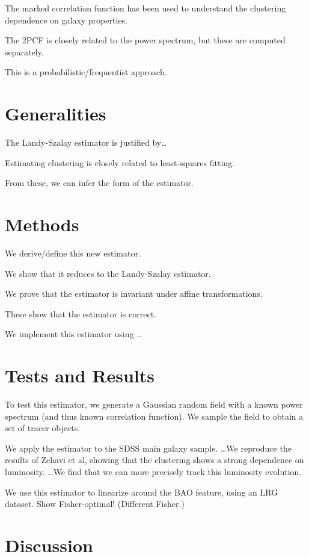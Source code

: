 \documentclass[modern]{aastex62}
\begin{document}
The marked correlation function has been used to understand the clustering dependence on galaxy properties.

The 2PCF is closely related to the power spectrum, but these are computed separately. 

This is a probabilistic/frequentist approach.

\section{Generalities}

The Landy-Szalay estimator is justified by\ldots

Estimating clustering is closely related to least-squares fitting.

From these, we can infer the form of the estimator.

\section{Methods}

We derive/define this new estimator.

We show that it reduces to the Landy-Szalay estimator.

We prove that the estimator is invariant under affine transformations.

These show that the estimator is correct.

We implement this estimator using \ldots

\section{Tests and Results}

To test this estimator, we generate a Gaussian random field with a known power spectrum (and thus known correlation function). We sample the field to obtain a set of tracer objects.

We apply the estimator to the SDSS main galaxy sample. \ldots We reproduce the results of Zehavi et al, showing that the clustering shows a strong dependence on luminosity. \ldots We find that we can more precisely track this luminosity evolution.

We use this estimator to linearize around the BAO feature, using an LRG dataset. Show Fisher-optimal! (Different Fisher.)

\section{Discussion}
\end{document}
